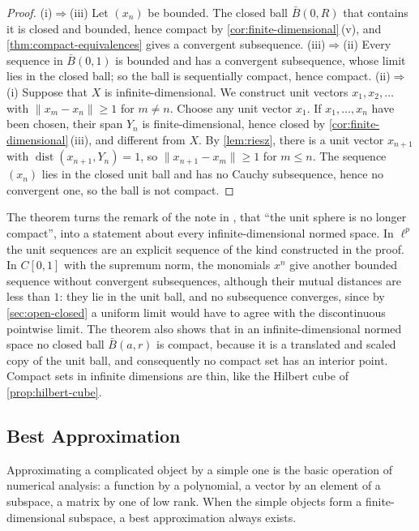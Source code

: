 \begin{proof}
(i)$\Rightarrow$(iii) Let $(x_n)$ be bounded. The closed ball $\bar B(0,R)$ that contains it is closed and bounded, hence compact by \cref{cor:finite-dimensional}\,(v), and \cref{thm:compact-equivalences} gives a convergent subsequence. (iii)$\Rightarrow$(ii) Every sequence in $\bar B(0,1)$ is bounded and has a convergent subsequence, whose limit lies in the closed ball; so the ball is sequentially compact, hence compact. (ii)$\Rightarrow$(i) Suppose that $X$ is infinite-dimensional. We construct unit vectors $x_1,x_2,\ldots$ with $\|x_m-x_n\|\ge1$ for $m\ne n$. Choose any unit vector $x_1$. If $x_1,\ldots,x_n$ have been chosen, their span $Y_n$ is finite-dimensional, hence closed by \cref{cor:finite-dimensional}\,(iii), and different from $X$. By \cref{lem:riesz}, there is a unit vector $x_{n+1}$ with $\operatorname{dist}(x_{n+1},Y_n)=1$, so $\|x_{n+1}-x_m\|\ge1$ for $m\le n$. The sequence $(x_n)$ lies in the closed unit ball and has no Cauchy subsequence, hence no convergent one, so the ball is not compact.
\end{proof}

The theorem turns the remark of the note in , that ``the unit sphere is no longer compact'', into a statement about every infinite-dimensional normed space. In $\ell^p$ the unit sequences are an explicit sequence of the kind constructed in the proof. In $C[0,1]$ with the supremum norm, the monomials $x^n$ give another bounded sequence without convergent subsequences, although their mutual distances are less than $1$: they lie in the unit ball, and no subsequence converges, since by \cref{sec:open-closed} a uniform limit would have to agree with the discontinuous pointwise limit. The theorem also shows that in an infinite-dimensional normed space no closed ball $\bar B(a,r)$ is compact, because it is a translated and scaled copy of the unit ball, and consequently no compact set has an interior point. Compact sets in infinite dimensions are thin, like the Hilbert cube of \cref{prop:hilbert-cube}.

\subsection{Best Approximation}

Approximating a complicated object by a simple one is the basic operation of numerical analysis: a function by a polynomial, a vector by an element of a subspace, a matrix by one of low rank. When the simple objects form a finite-dimensional subspace, a best approximation always exists.


